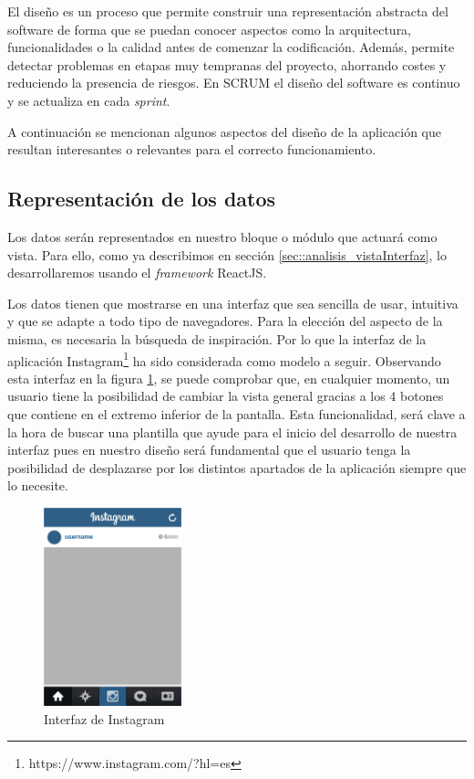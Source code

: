 El diseño es un proceso que permite construir una representación abstracta del software de forma que se puedan conocer aspectos como la arquitectura, funcionalidades o la calidad antes de comenzar la codificación. Además, permite detectar problemas en etapas muy tempranas del proyecto, ahorrando costes y reduciendo la presencia de riesgos. En SCRUM el diseño del software es continuo y se actualiza en cada \textit{sprint}.

A continuación se mencionan algunos aspectos del diseño de la aplicación que resultan interesantes o relevantes para el correcto funcionamiento.

\subsection{Representación de los datos}

Los datos serán representados en nuestro bloque o módulo que actuará como vista. Para ello, como ya describimos en sección \ref{sec::analisis_vistaInterfaz}, lo desarrollaremos usando el \textit{framework} ReactJS.

Los datos tienen que mostrarse en una interfaz que sea sencilla de usar, intuitiva y que se adapte a todo tipo de navegadores. Para la elección del aspecto de la misma, es necesaria la búsqueda de inspiración. Por lo que la interfaz de la aplicación Instagram\footnote{https://www.instagram.com/?hl=es} ha sido considerada como modelo a seguir. Observando esta interfaz en la figura \ref{fig::insta}, se puede comprobar que, en cualquier momento, un usuario tiene la posibilidad de cambiar la vista general gracias a los 4 botones que contiene en el extremo inferior de la pantalla. Esta funcionalidad, será clave a la hora de buscar una plantilla que ayude para el inicio del desarrollo de nuestra interfaz pues en nuestro diseño será fundamental que el usuario tenga la posibilidad de desplazarse por los distintos apartados de la aplicación siempre que lo necesite.

\begin{figure}[htbp]
    \centerline{\includegraphics[width=4cm]{figuras/insta.jpg}}
    \caption{Interfaz de Instagram}
    \label{fig::insta}
\end{figure}

